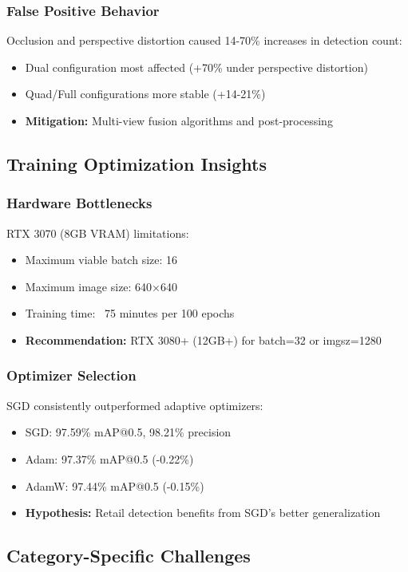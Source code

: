 \documentclass[conference]{IEEEtran}
\begin{document}
\subsubsection{False Positive Behavior}
Occlusion and perspective distortion caused 14-70\% increases in detection count:
\begin{itemize}
    \item Dual configuration most affected (+70\% under perspective distortion)
    \item Quad/Full configurations more stable (+14-21\%)
    \item \textbf{Mitigation:} Multi-view fusion algorithms and post-processing
\end{itemize}

\subsection{Training Optimization Insights}

\subsubsection{Hardware Bottlenecks}
RTX 3070 (8GB VRAM) limitations:
\begin{itemize}
    \item Maximum viable batch size: 16
    \item Maximum image size: 640×640
    \item Training time: ~75 minutes per 100 epochs
    \item \textbf{Recommendation:} RTX 3080+ (12GB+) for batch=32 or imgsz=1280
\end{itemize}

\subsubsection{Optimizer Selection}
SGD consistently outperformed adaptive optimizers:
\begin{itemize}
    \item SGD: 97.59\% mAP@0.5, 98.21\% precision
    \item Adam: 97.37\% mAP@0.5 (-0.22\%)
    \item AdamW: 97.44\% mAP@0.5 (-0.15\%)
    \item \textbf{Hypothesis:} Retail detection benefits from SGD's better generalization
\end{itemize}

\subsection{Category-Specific Challenges}
\end{document}
